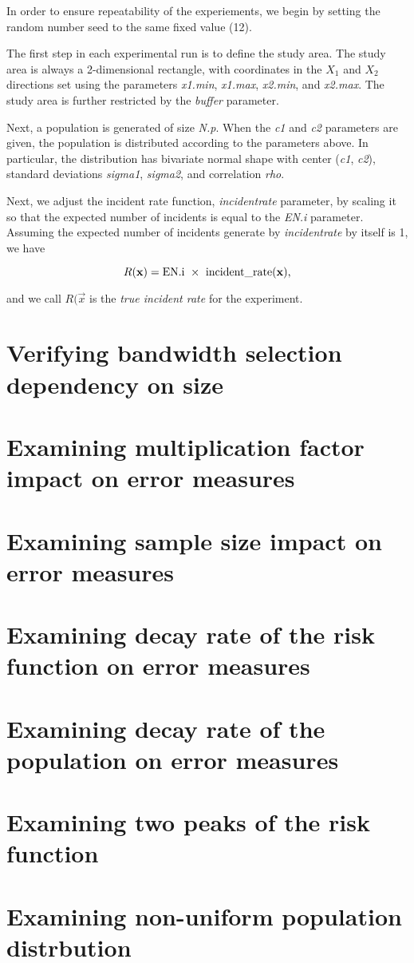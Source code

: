In order to ensure repeatability of the experiements, we begin by setting the random number seed to the same fixed value (12).

The first step in each experimental run is to define the study area. 
The study area is always a 2-dimensional rectangle, with coordinates in the \(X_1\) and \(X_2\) directions set using the parameters \textit{x1.min}, \textit{x1.max}, \textit{x2.min}, and \textit{x2.max}.
The study area is further restricted by the \textit{buffer} parameter.

Next, a population is generated of size \textit{N.p}.
When the \textit{c1} and \textit{c2} parameters are given, the population is distributed according to the parameters above.
In particular, the distribution has bivariate normal shape with center (\textit{c1}, \textit{c2}),
standard deviations \textit{sigma1}, \textit{sigma2}, and correlation \textit{rho}.

Next, we adjust the incident rate function, \textit{incident\textunderscore rate} parameter, by scaling it so that the expected number of incidents is equal to the \textit{EN.i} parameter.
Assuming the expected number of incidents generate by \textit{incident\textunderscore rate} by itself is 1, we have

\[
    R(\vec{x}) = \mbox{EN.i}~\times~\mbox{incident\textunderscore rate}(\vec{x}) \text{,}
\]

and we call \(R(\vec{x}\) is the \textit{true incident rate} for the experiment.

\section{Verifying bandwidth selection dependency on size}

\section{Examining multiplication factor impact on error measures}

\section{Examining sample size impact on error measures}

\section{Examining decay rate of the risk function on error measures}

\section{Examining decay rate of the population on error measures}

\section{Examining two peaks of the risk function}

\section{Examining non-uniform population distrbution}